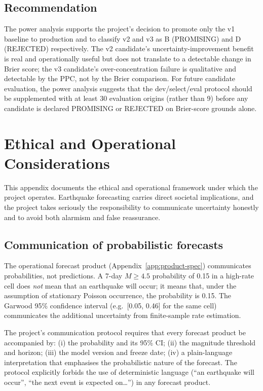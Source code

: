 \documentclass[10pt,a4paper,twocolumn]{article}
\begin{document}
\subsection{Recommendation}

The power analysis supports the project's decision to promote only the v1 baseline to production and to classify v2 and v3 as B (PROMISING) and D (REJECTED) respectively. The v2 candidate's uncertainty-improvement benefit is real and operationally useful but does not translate to a detectable change in Brier score; the v3 candidate's over-concentration failure is qualitative and detectable by the PPC, not by the Brier comparison. For future candidate evaluation, the power analysis suggests that the dev/select/eval protocol should be supplemented with at least 30 evaluation origins (rather than 9) before any candidate is declared PROMISING or REJECTED on Brier-score grounds alone.

\section{Ethical and Operational Considerations}\label{app:ethics}

This appendix documents the ethical and operational framework under which the project operates. Earthquake forecasting carries direct societal implications, and the project takes seriously the responsibility to communicate uncertainty honestly and to avoid both alarmism and false reassurance.

\subsection{Communication of probabilistic forecasts}

The operational forecast product (Appendix~\ref{app:product-spec}) communicates probabilities, not predictions. A 7-day $M\geq4.5$ probability of 0.15 in a high-rate cell does \emph{not} mean that an earthquake will occur; it means that, under the assumption of stationary Poisson occurrence, the probability is 0.15. The Garwood 95\% confidence interval (e.g.\ [0.05, 0.46] for the same cell) communicates the additional uncertainty from finite-sample rate estimation.

The project's communication protocol requires that every forecast product be accompanied by: (i) the probability and its 95\% CI; (ii) the magnitude threshold and horizon; (iii) the model version and freeze date; (iv) a plain-language interpretation that emphasises the probabilistic nature of the forecast. The protocol explicitly forbids the use of deterministic language (``an earthquake will occur'', ``the next event is expected on\dots'') in any forecast product.
\end{document}
